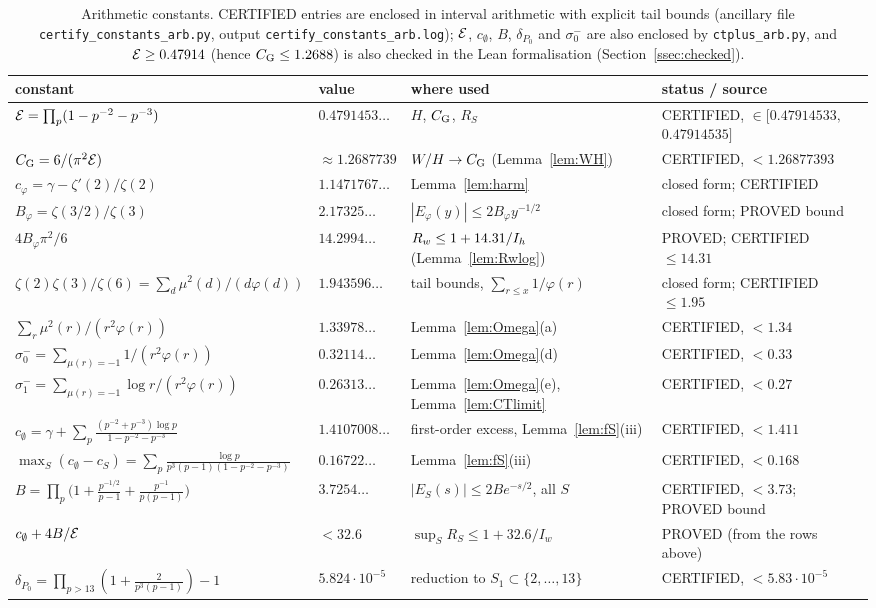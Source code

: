 \begin{table}[ht]
\centering\footnotesize\setlength{\tabcolsep}{3pt}
\begin{tabular}{@{}l l >{\raggedright}p{3.9cm} >{\raggedright\arraybackslash}p{3.1cm}@{}}
\hline
constant & value & where used & status / source\\
\hline
$\mathcal{E}=\prod_p(1-p^{-2}-p^{-3})$ & $0.4791453\ldots$ & $H$, $C_{\mathrm G}$, $R_S$ & CERTIFIED, $\in[0.47914533,$ $0.47914535]$\\
$C_{\mathrm G}=6/(\pi^2\mathcal{E})$ & $\approx1.2687739$ & $W/H\to C_{\mathrm G}$ (Lemma~\ref{lem:WH}) & CERTIFIED, $<1.26877393$\\
$c_\varphi=\gamma-\zeta'(2)/\zeta(2)$ & $1.1471767\ldots$ & Lemma~\ref{lem:harm} & closed form; CERTIFIED\\
$B_\varphi=\zeta(3/2)/\zeta(3)$ & $2.17325\ldots$ & $|E_\varphi(y)|\le2B_\varphi y^{-1/2}$ & closed form; PROVED bound\\
$4B_\varphi\pi^2/6$ & $14.2994\ldots$ & $R_w\le1+14.31/I_h$ (Lemma~\ref{lem:Rwlog}) & PROVED; CERTIFIED $\le14.31$\\
$\zeta(2)\zeta(3)/\zeta(6)=\sum_d\mu^2(d)/(d\varphi(d))$ & $1.943596\ldots$ & tail bounds, $\sum_{r\le x}1/\varphi(r)$ & closed form; CERTIFIED $\le1.95$\\
$\sum_r\mu^2(r)/(r^2\varphi(r))$ & $1.33978\ldots$ & Lemma~\ref{lem:Omega}(a) & CERTIFIED, $<1.34$\\
$\sigma_0^-=\sum_{\mu(r)=-1}1/(r^2\varphi(r))$ & $0.32114\ldots$ & Lemma~\ref{lem:Omega}(d) & CERTIFIED, $<0.33$\\
$\sigma_1^-=\sum_{\mu(r)=-1}\log r/(r^2\varphi(r))$ & $0.26313\ldots$ & Lemma~\ref{lem:Omega}(e), Lemma~\ref{lem:CTlimit} & CERTIFIED, $<0.27$\\
$c_\emptyset=\gamma+\sum_p\frac{(p^{-2}+p^{-3})\log p}{1-p^{-2}-p^{-3}}$ & $1.4107008\ldots$ & first-order excess, Lemma~\ref{lem:fS}(iii) & CERTIFIED, $<1.411$\\
$\max_S(c_\emptyset-c_S)=\sum_p\frac{\log p}{p^3(p-1)(1-p^{-2}-p^{-3})}$ & $0.16722\ldots$ & Lemma~\ref{lem:fS}(iii) & CERTIFIED, $<0.168$\\
$B=\prod_p\big(1+\frac{p^{-1/2}}{p-1}+\frac{p^{-1}}{p(p-1)}\big)$ & $3.7254\ldots$ & $|E_S(s)|\le2Be^{-s/2}$, all $S$ & CERTIFIED, $<3.73$; PROVED bound\\
$c_\emptyset+4B/\mathcal{E}$ & $<32.6$ & $\sup_SR_S\le1+32.6/I_w$ & PROVED (from the rows above)\\
$\delta_{P_0}=\prod_{p>13}(1+\frac2{p^3(p-1)})-1$ & $5.824\cdot10^{-5}$ & reduction to $S_1\subset\{2,\dots,13\}$ & CERTIFIED, $<5.83\cdot10^{-5}$\\
\hline
\end{tabular}
\caption{Arithmetic constants. CERTIFIED entries are enclosed in interval arithmetic with explicit tail bounds (ancillary file
\texttt{certify\_constants\_arb.py}, output \texttt{certify\_constants\_arb.log}); $\mathcal{E}$, $c_\emptyset$, $B$, $\delta_{P_0}$ and $\sigma_0^-$ are also enclosed by
\texttt{ctplus\_arb.py}, and $\mathcal{E}\ge0.47914$ (hence $C_{\mathrm G}\le1.2688$) is also checked in the Lean formalisation (Section~\ref{ssec:checked}).}\label{tab:constants}
\end{table}

